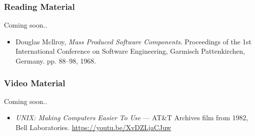 \begin{frame}

\frametitle{Reading Material}

\begin{center}

Coming soon..

\end{center}

\footnotesize

\begin{itemize}

\item Douglas Mcllroy, \emph{Mass Produced Software Components}. Proceedings of
the 1st International Conference on Software Engineering, Garmisch
Pattenkirchen, Germany. pp. 88--98, 1968.

\end{itemize}

\end{frame}


\begin{frame}

\frametitle{Video Material}

\begin{center}

Coming soon..

\end{center}

\footnotesize

\begin{itemize}

\item \emph{UNIX: Making Computers Easier To Use} --- AT\&T Archives film from
1982, Bell Laboratories. \url{https://youtu.be/XvDZLjaCJuw}

\end{itemize}

\end{frame}

